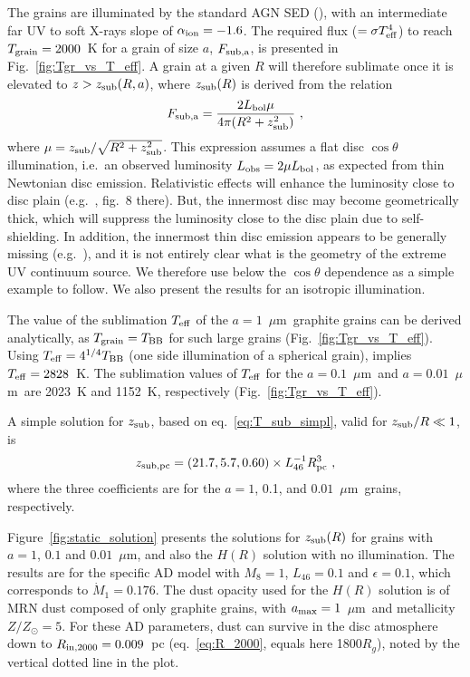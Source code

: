 \documentclass[a4paper,fleqn,usenatbib]{mnras}
\newcommand{\mdot}{\dot{M}}
\newcommand{\aion}{\mbox{$\alpha_{\rm ion}$}}
\newcommand{\mic}{\mbox{$\mu$m}}
\newcommand{\Tgr}{\mbox{$T_{\rm grain}$}}
\begin{document}
The grains are illuminated by the standard AGN SED (\citealt{paperII}), with an intermediate far UV to soft X-rays slope of $\aion=-1.6$. The required flux ($=\sigma T_{\rm eff}^4$) 
to reach $\Tgr=2000$~K for a grain of size
$a$, $F_{\rm sub, a}$, is presented in Fig.~\ref{fig:Tgr_vs_T_eff}. A grain at a given $R$ will therefore sublimate
once it is elevated to $z>z_{\rm sub}(R,a)$, where $z_{\rm sub}(R)$ is derived from the relation
\begin{equation}
F_{\rm sub, a}=\frac{2 L_{\rm bol} \mu}{4\pi (R^2+z_{\rm sub}^2)}\ , 
\label{eq:T_sub_simpl}
\end{equation}
where $\mu=z_{\rm sub}/\sqrt{R^2+z_{\rm sub}^2}$.
This expression assumes a flat disc $\cos \theta$ illumination, i.e.\ an observed luminosity $L_{\rm obs}=2\mu L_{\rm bol}$,
as expected from thin Newtonian disc emission. Relativistic
effects will enhance the luminosity close to disc plain (e.g.\ \citealt{LaorNetzer89}, fig.~8 there). 
But, the innermost disc may become geometrically thick, which will suppress the 
luminosity close to the disc plain due to self-shielding. In addition, the innermost thin disc emission 
appears to be generally missing (e.g.\ \citealt{LaorDavis14}), and it is not entirely clear what is 
the geometry of the extreme UV continuum source. We therefore use below the $\cos\theta$ dependence
as a simple example to follow. We also present the results for an isotropic illumination. 

The value of the sublimation $T_{\rm eff}$ of the $a=1$~\mic\ graphite grains can be derived analytically, 
as $\Tgr=T_{\rm BB}$ for such large grains (Fig.~\ref{fig:Tgr_vs_T_eff}). 
Using $T_{\rm eff}=4^{1/4}T_{\rm BB}$ (one side illumination of a spherical grain), implies $T_{\rm eff}=2828$~K.
The sublimation values  of $T_{\rm eff}$ for the $a=0.1$~\mic\ and $a=0.01$~\mic\ are 2023~K and 1152~K, respectively (Fig.~\ref{fig:Tgr_vs_T_eff}). 

A simple solution for $z_{\rm sub}$, based on eq.~\ref{eq:T_sub_simpl}, valid for  $z_{\rm sub}/R\ll 1$, is
\begin{equation}
z_{\rm sub, pc}=(21.7, 5.7, 0.60)\times L_{46}^{-1}R_{\rm pc}^3\ ,
\label{eq:z_sub}
\end{equation}
where the three coefficients are for the $a=1$, 0.1, and $0.01$~\mic\ grains, respectively.

Figure~\ref{fig:static_solution} presents the solutions for $z_{\rm sub}(R)$ for grains with
$a=1$, $0.1$ and $0.01$~\mic, and also the $H(R)$ solution with no illumination. The results are for the
specific AD model with $M_8=1$, $L_{46}=0.1$ and $\epsilon=0.1$, which corresponds to $\mdot_1=0.176$. 
The dust opacity used for the $H(R)$ solution is of MRN dust composed of
only graphite grains, with $a_{\rm max}=1$~\mic\ and metallicity $Z/Z_\odot=5$.   
For these AD parameters, dust can survive in the disc atmosphere down to
$R_{\rm in, 2000}=0.009$~pc (eq.~\ref{eq:R_2000}, equals here 1800$R_g$), 
noted by the vertical dotted line in the plot. 
\end{document}
